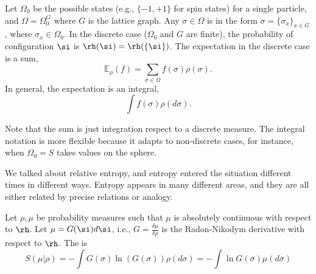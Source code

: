 

\begin{rem}
Let $\Omega_0$ be the possible states (e.g., $\{-1, +1\}$ for spin states) for a single particle, and $\Omega = \Omega_0^G$ where $G$ is the lattice graph. Any $\sigma \in \Omega$ is in the form $\sigma = \{\sigma_x\}_{x \in G}$, where $\sigma_x \in \Omega_0$. 
In the discrete case ($\Omega_0$ and $G$ are finite), the probability of configuration $\si$ is $\rh(\si) = \rh(\{\si\})$.
The expectation in the discrete case is a sum,
\[
\mathbb{E}_{\rho}(f) = \sum_{\sigma \in \Omega} f(\sigma) \rho(\sigma).
\]
In general, the expectation is an integral,
\[
\int f(\sigma) \rho(d\sigma).
\]

Note that the sum is just integration respect to a discrete measure. The integral notation is more flexible because it adapts to non-discrete cases, for instance, when $\Omega_0 = S$ takes values on the sphere. 
\end{rem}


We talked about relative entropy, and entropy entered the situation different times in different ways. Entropy appears in many different areas, and they are all either related by precise relations or analogy. 

\begin{df} 
Let $\rho,\mu$ be probability measures such that $\mu$ is absolutely continuous with respect to $\rh$. Let $\mu = G(\si)d\si$, i.e., $G=\frac{\delta\mu}{\delta\rho}$ is the Radon-Nikodym derivative with respect to $\rh$. 
The  is 
\[
S(\mu | \rho) = -\int G(\sigma) \ln(G(\sigma))\rho(d\sigma) = - \int \ln G(\sigma) \mu(d\sigma)
\]
\end{df}


